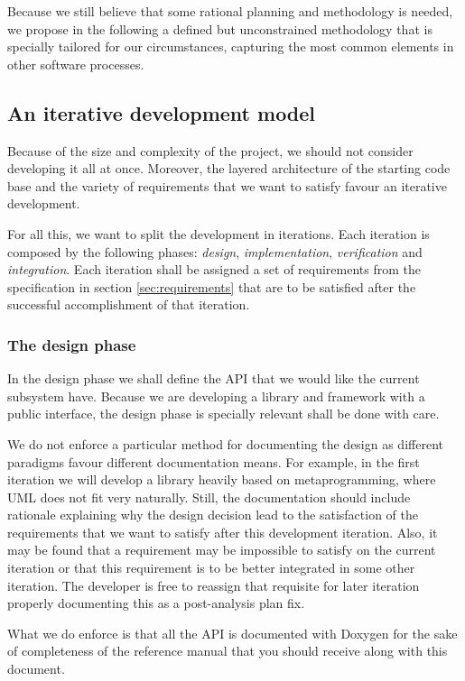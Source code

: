 Because we still believe that some rational planning and methodology
is needed, we propose in the following a defined but unconstrained
methodology that is specially tailored for our circumstances,
capturing the most common elements in other software processes.

\subsection{An iterative development model}

Because of the size and complexity of the project, we should not
consider developing it all at once. Moreover, the layered architecture
of the starting code base and the variety of requirements that we want
to satisfy favour an iterative development.

For all this, we want to split the development in iterations. Each
iteration is composed by the following phases:  \emph{design},
\emph{implementation}, \emph{verification} and
\emph{integration}. Each iteration shall be assigned a set of
requirements from the specification in section \ref{sec:requirements}
that are to be satisfied after the successful accomplishment of that
iteration.

\subsubsection{The design phase}

In the design phase we shall define the API that we would like the
current subsystem have. Because we are developing a library and
framework with a public interface, the design phase is specially
relevant shall be done with care.

We do not enforce a particular method for documenting the design as
different paradigms favour different documentation means. For example,
in the first iteration we will develop a library heavily based on
metaprogramming, where UML does not fit very naturally. Still, the
documentation should include rationale explaining why the design
decision lead to the satisfaction of the requirements that we want to
satisfy after this development iteration. Also, it may be found that a
requirement may be impossible to satisfy on the current iteration or
that this requirement is to be better integrated in some other
iteration. The developer is free to reassign that requisite for later
iteration properly documenting this as a post-analysis plan fix.

What we do enforce is that all the API is documented with Doxygen for
the sake of completeness of the reference manual that you should
receive along with this document.

